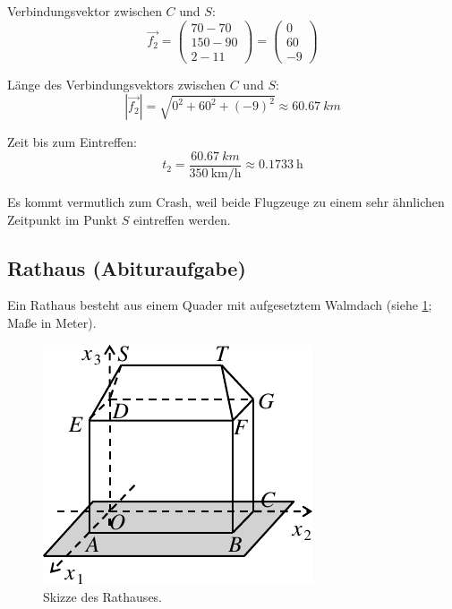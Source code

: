 \documentclass{ajc}
\numberwithin{equation}{subsection}
\begin{document}
	Verbindungsvektor zwischen $C$ und $S$:
	\begin{equation}
		\overrightarrow{f_2} = \left(\begin{array}{r} 70 - 70 \\ 150 - 90 \\ 2 - 11\end{array}\right) = \left(\begin{array}{r} 0 \\ 60 \\ -9\end{array}\right) 
	\end{equation}
	
	Länge des Verbindungsvektors zwischen $C$ und $S$:
	\begin{equation}
		\left|\overrightarrow{f_2}\right| = \sqrt{0^2 + 60^2 + (-9)^2} \approx \SI{60,67}{km}
	\end{equation}
	
	Zeit bis zum Eintreffen:
	\begin{equation}
		t_2 = \frac{\SI{60,67}{km}}{\SI{350}{\km\per\hour}} \approx \SI{0,1733}{\hour}
	\end{equation}
	
	Es kommt vermutlich zum Crash, weil beide Flugzeuge zu einem sehr ähnlichen Zeitpunkt im Punkt $S$ eintreffen werden.
	
	\subsection{Rathaus (Abituraufgabe)}
	Ein Rathaus besteht aus einem Quader mit aufgesetztem Walmdach (siehe \ref{fig:004_rathaus}; Maße in Meter).
	
	\begin{figure}[ht]
		\centering
		\includegraphics[width=.5\textwidth]{ma_004_rathaus.pdf}
		\caption{Skizze des Rathauses.}
		\label{fig:004_rathaus}
	\end{figure}
	
\end{document}
